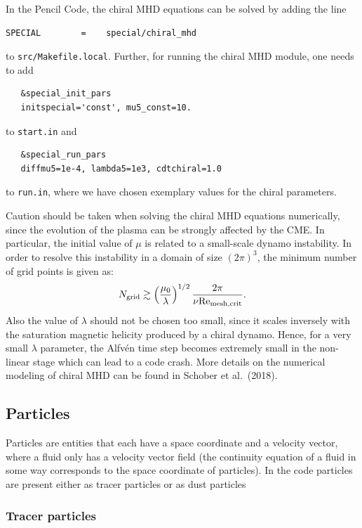 \documentclass[\mydriver,12pt,twoside,notitlepage,a4paper]{article}
\begin{document}
In the Pencil Code, the chiral MHD equations can be solved by adding the line
\begin{verbatim}
SPECIAL        =    special/chiral_mhd 
\end{verbatim}
to \texttt{src/Makefile.local}.
Further, for running the chiral MHD module, one needs to add
\begin{verbatim}
   &special_init_pars
   initspecial='const', mu5_const=10.
\end{verbatim}
to \texttt{start.in} and
\begin{verbatim}
   &special_run_pars
   diffmu5=1e-4, lambda5=1e3, cdtchiral=1.0
\end{verbatim}
to \texttt{run.in}, where we have chosen exemplary values for the chiral
parameters.

Caution should be taken when solving the chiral MHD equations
numerically, since the evolution of the plasma can be strongly affected by 
the CME. 
In particular, the initial value of $\mu$ is related to 
a small-scale dynamo instability. 
In order to resolve this instability in a domain of size $(2\pi)^3$, 
the minimum number of grid points is given as:
\begin{equation}
  N_\mathrm{grid} \gtrsim \left(\frac{\mu_0}{\lambda}\right)^{1/2} \frac{2\pi}{\nu \mbox{Re}_{\rm mesh, crit}}.
\end{equation}
Also the value of $\lambda$ should not be chosen too small, since it scales 
inversely with the saturation magnetic helicity produced by a chiral dynamo. 
Hence, for a very small $\lambda$ parameter, the Alfv\'en time step becomes extremely small in the non-linear stage which can lead to a code crash.    
More details on the numerical modeling of chiral MHD can be found in
Schober et al.\ (2018).


\subsection{Particles}
\label{S-particles-equations}

Particles are entities that each have a space coordinate and a velocity vector,
where a fluid only has a velocity vector field (the continuity equation of a
fluid in some way corresponds to the space coordinate of particles). In the
code particles are present either as tracer particles or as dust particles

\subsubsection{Tracer particles}
\end{document}
